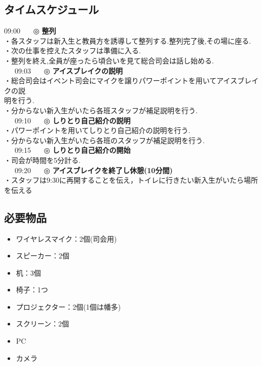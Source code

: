 \subsection{タイムスケジュール}
09:00 \ \ \ ◎ \textbf{整列} \\
\hspace{15mm}・各スタッフは新入生と教員方を誘導して整列する.整列完了後,その場に座る.\\
\hspace{15mm}・次の仕事を控えたスタッフは準備に入る.\\
\hspace{15mm}・整列を終え,全員が座ったら頃合いを見て総合司会は話し始める.\\
\ \ \ 09:03 \ \ \ ◎ \textbf{アイスブレイクの説明}\\
\hspace{15mm}・総合司会はイベント司会にマイクを譲りパワーポイントを用いてアイスブレイクの説\\
\hspace{15mm}明を行う.\\
\hspace{15mm}・分からない新入生がいたら各班スタッフが補足説明を行う.\\
\ \ \ 09:10 \ \ \ ◎ \textbf{しりとり自己紹介の説明}\\
\hspace{15mm}・パワーポイントを用いてしりとり自己紹介の説明を行う.\\
\hspace{15mm}・分からない新入生がいたら各班のスタッフが補足説明を行う.\\
\ \ \ 09:15 \ \ \ ◎ \textbf{しりとり自己紹介の開始}\\
\hspace{15mm}・司会が時間を5分計る.\\
\ \ \ 09:20 \ \ \ ◎ \textbf{アイスブレイクを終了し休憩(10分間)} \\
\hspace{15mm}・スタッフは9:30に再開することを伝え，トイレに行きたい新入生がいたら場所を伝える \\

\subsection{必要物品}
\begin{itemize}
  \item ワイヤレスマイク：2個(司会用)
  \item スピーカー：2個
  \item 机：3個
  \item 椅子：1つ
  \item プロジェクター：2個(1個は幡多)
  \item スクリーン：2個
  \item PC
  \item カメラ

\end{itemize}
